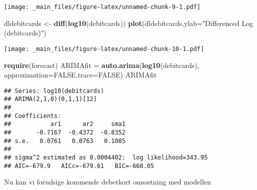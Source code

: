 \documentclass[]{book}
\newenvironment{Shaded}{\begin{snugshade}}{\end{snugshade}}
\newcommand{\DataTypeTok}[1]{\textcolor[rgb]{0.13,0.29,0.53}{#1}}
\newcommand{\KeywordTok}[1]{\textcolor[rgb]{0.13,0.29,0.53}{\textbf{#1}}}
\newcommand{\NormalTok}[1]{#1}
\newcommand{\OtherTok}[1]{\textcolor[rgb]{0.56,0.35,0.01}{#1}}
\newcommand{\StringTok}[1]{\textcolor[rgb]{0.31,0.60,0.02}{#1}}
\begin{document}
\texttt{[image: \_main\_files/figure-latex/unnamed-chunk-9-1.pdf]}

\begin{Shaded}
\begin{Highlighting}[]
\NormalTok{dldebitcards <-}\StringTok{ }\KeywordTok{diff}\NormalTok{(}\KeywordTok{log10}\NormalTok{(debitcards))}
\KeywordTok{plot}\NormalTok{(dldebitcards,}\DataTypeTok{ylab=}\StringTok{"Differenced Log (debitcards)"}\NormalTok{)}
\end{Highlighting}
\end{Shaded}

\texttt{[image: \_main\_files/figure-latex/unnamed-chunk-10-1.pdf]}

\begin{Shaded}
\begin{Highlighting}[]
\KeywordTok{require}\NormalTok{(forecast)}
\NormalTok{ARIMAfit =}\StringTok{ }\KeywordTok{auto.arima}\NormalTok{(}\KeywordTok{log10}\NormalTok{(debitcards), }\DataTypeTok{approximation=}\OtherTok{FALSE}\NormalTok{,}\DataTypeTok{trace=}\OtherTok{FALSE}\NormalTok{)}
\NormalTok{ARIMAfit}
\end{Highlighting}
\end{Shaded}

\begin{verbatim}
## Series: log10(debitcards) 
## ARIMA(2,1,0)(0,1,1)[12] 
## 
## Coefficients:
##           ar1      ar2     sma1
##       -0.7167  -0.4372  -0.8352
## s.e.   0.0761   0.0763   0.1085
## 
## sigma^2 estimated as 0.0004402:  log likelihood=343.95
## AIC=-679.9   AICc=-679.61   BIC=-668.05
\end{verbatim}

Nu kan vi forudsige kommende debetkort omsætning med modellen
\end{document}
